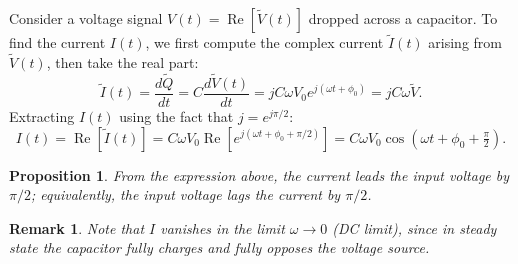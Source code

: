 \documentclass{article}
\newtheorem{remark}{Remark}
\newtheorem{proposition}{Proposition}
\begin{document}
Consider a voltage signal $V(t) = \operatorname{Re}[\tilde{V}(t)]$ dropped across a capacitor. To find the current $I(t)$, we first compute the complex current $\tilde{I}(t)$ arising from $\tilde{V}(t)$, then take the real part:
\[\tilde{I}(t) = \frac{d\tilde{Q}}{dt} = C\frac{d\tilde{V}(t)}{dt} = j C\omega V_0 e^{j(\omega t + \phi_0)} = j C\omega\tilde{V}.\]
Extracting $I(t)$ using the fact that $j = e^{j\pi/2}$:
\[I(t) = \operatorname{Re}\!\left[\tilde{I}(t)\right] = C\omega V_0\operatorname{Re}\!\left[e^{j(\omega t + \phi_0 + \pi/2)}\right] = C\omega V_0\cos\!\left(\omega t + \phi_0 + \tfrac{\pi}{2}\right).\]
\begin{proposition}
    From the expression above, the current leads the input voltage by $\pi/2$; equivalently, the input voltage lags the current by $\pi/2$.
\end{proposition}
\begin{remark}
    Note that $I$ vanishes in the limit $\omega \to 0$ (DC limit), since in steady state the capacitor fully charges and fully opposes the voltage source.
\end{remark}
\end{document}
